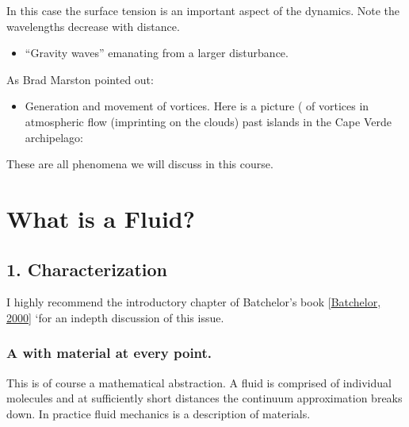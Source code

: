 \documentclass[letterpaper,10pt,english]{jupyterBook}
\begin{document}
\sphinxAtStartPar
{}

\sphinxAtStartPar
In this case the surface tension is an important aspect of the dynamics.
Note the wavelengths decrease with distance.
\begin{itemize}
\item {} 
\sphinxAtStartPar
“Gravity waves” emanating from a larger disturbance.

\end{itemize}







\sphinxAtStartPar
As Brad Marston pointed out:






\begin{itemize}
\item {} 
\sphinxAtStartPar
Generation and movement of vortices. Here is a picture ( of vortices in atmospheric flow (imprinting on the clouds) past islands in the Cape Verde archipelago:

\end{itemize}

\sphinxAtStartPar
{}

\sphinxAtStartPar
These are all phenomena we will discuss in this course.


\section{What is a Fluid?}
\label{\detokenize{chapter1/whatis_fluid:what-is-a-fluid}}\label{\detokenize{chapter1/whatis_fluid::doc}}

\subsection{1. Characterization}
\label{\detokenize{chapter1/whatis_fluid:characterization}}
\sphinxAtStartPar
I highly recommend the introductory chapter of Batchelor’s book
{[}\hyperlink{cite.bibliography:id3}{Batchelor, 2000}{]} `for an
in\sphinxhyphen{}depth discussion of this issue.


\subsubsection{A  with material at every point.}
\label{\detokenize{chapter1/whatis_fluid:a-continuous-medium-with-material-at-every-point}}
\sphinxAtStartPar
This is of course a mathematical abstraction. A fluid is comprised of
individual molecules and at sufficiently short distances the continuum
approximation breaks down. In practice fluid mechanics is a 
description of materials.
\end{document}
